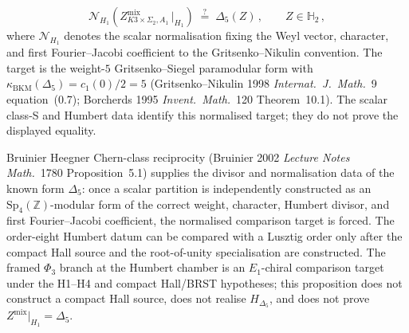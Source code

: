 \begin{proposition}
\begin{enumerate}[label=\textup{(\roman*)}]
 \[
 \mathcal N_{H_1}\!\left(
 Z^{\mathrm{mix}}_{K3\times\Sigma_2,A_1}\,\Big|_{H_1}
 \right)
 \;\overset{?}{=}\;\Delta_5(Z)\,,\qquad Z\in\mathbb H_2\,,
 \]
 where $\mathcal N_{H_1}$ denotes the scalar normalisation fixing the Weyl vector, character, and first Fourier--Jacobi coefficient to the Gritsenko--Nikulin convention. The target is the weight-$5$ Gritsenko--Siegel paramodular form with $\kappa_{\mathrm{BKM}}(\Delta_5)=c_1(0)/2=5$ (Gritsenko--Nikulin 1998 \emph{Internat.\ J.\ Math.}~9 equation~(0.7); Borcherds 1995 \emph{Invent.\ Math.}~120 Theorem~10.1). The scalar class-S and Humbert data identify this normalised target; they do not prove the displayed equality.
\end{enumerate}
Bruinier Heegner Chern-class reciprocity (Bruinier 2002 \emph{Lecture Notes Math.}~1780 Proposition~5.1) supplies the divisor and normalisation data of the known form $\Delta_5$: once a scalar partition is independently constructed as an $\mathrm{Sp}_4(\mathbb Z)$-modular form of the correct weight, character, Humbert divisor, and first Fourier--Jacobi coefficient, the normalised comparison target is forced. The order-eight Humbert datum can be compared with a Lusztig order only after the compact Hall source and the root-of-unity specialisation are constructed. The framed \(\Phi_3\) branch at the Humbert chamber is an \(E_1\)-chiral comparison target under the H1--H4 and compact Hall/BRST hypotheses; this proposition does not construct a compact Hall source, does not realise \(H_{\Delta_5}\), and does not prove \(Z^{\mathrm{mix}}\vert_{H_1}=\Delta_5\).
\end{proposition}

